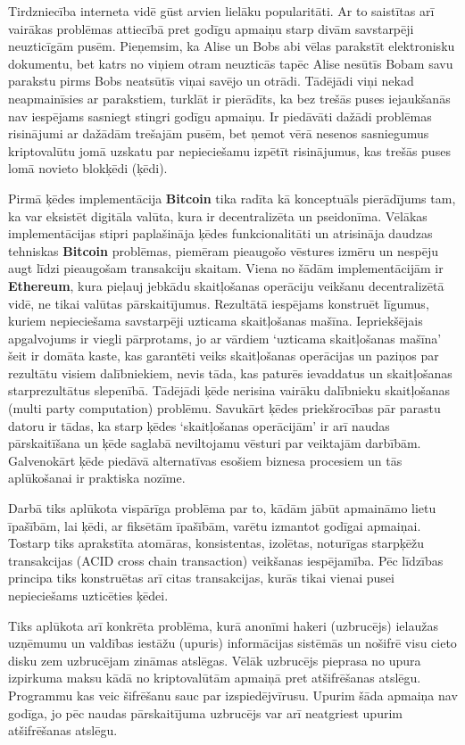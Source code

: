 Tirdzniecība interneta vidē gūst arvien lielāku popularitāti. 
Ar to saistītas arī vairākas problēmas attiecībā pret godīgu apmaiņu starp divām savstarpēji neuzticīgām pusēm. 
Pieņemsim, ka Alise un Bobs abi vēlas parakstīt elektronisku dokumentu, bet katrs no viņiem otram neuzticās tapēc Alise nesūtīs Bobam savu parakstu pirms Bobs neatsūtīs viņai savējo un otrādi. 
Tādējādi viņi nekad neapmainīsies ar parakstiem, turklāt ir pierādīts, ka bez trešās puses iejaukšanās nav iespējams sasniegt stingri godīgu apmaiņu.\cite{pagnia99}
Ir piedāvāti dažādi problēmas risinājumi ar dažādām trešajām pusēm, bet ņemot vērā nesenos sasniegumus kriptovalūtu jomā uzskatu par nepieciešamu izpētīt risinājumus, kas trešās puses lomā novieto blokķēdi (ķēdi). 


Pirmā ķēdes implementācija \textbf{Bitcoin} tika radīta kā konceptuāls pierādījums tam, ka var eksistēt digitāla valūta, kura ir decentralizēta un pseidonīma. 
Vēlākas implementācijas stipri paplašināja ķēdes funkcionalitāti un atrisināja daudzas tehniskas \textbf{Bitcoin} problēmas, piemēram pieaugošo vēstures izmēru un nespēju augt līdzi pieaugošam transakciju skaitam.%
Viena no šādām implementācijām ir \textbf{Ethereum}, kura pieļauj jebkādu skaitļošanas operāciju veikšanu decentralizētā vidē, ne tikai valūtas pārskaitījumus.\cite{etherum}
Rezultātā iespējams konstruēt līgumus, kuriem nepieciešama savstarpēji uzticama skaitļošanas mašīna.
Iepriekšējais apgalvojums ir viegli pārprotams, jo ar vārdiem `uzticama skaitļošanas mašīna' šeit ir domāta kaste, kas garantēti veiks skaitļošanas operācijas un paziņos par rezultātu visiem dalībniekiem, nevis tāda, kas paturēs ievaddatus un skaitļošanas starprezultātus slepenībā.
Tādējādi ķēde nerisina vairāku dalībnieku skaitļošanas (multi party computation) problēmu.
Savukārt ķēdes priekšrocības pār parastu datoru ir tādas, ka starp ķēdes `skaitļošanas operācijām' ir arī naudas pārskaitīšana un ķēde saglabā neviltojamu vēsturi par veiktajām darbībām.
Galvenokārt ķēde piedāvā alternatīvas esošiem biznesa procesiem un tās aplūkošanai ir praktiska nozīme.

Darbā tiks aplūkota vispārīga problēma par to, kādām jābūt apmaināmo lietu īpašībām, lai ķēdi, ar fiksētām īpašībām, varētu izmantot godīgai apmaiņai. Tostarp tiks aprakstīta atomāras, konsistentas, izolētas, noturīgas starpķēžu transakcijas (ACID cross chain transaction) veikšanas iespējamība.\cite{back14,nolan13} 
Pēc līdzības principa tiks konstruētas arī citas transakcijas, kurās tikai vienai pusei nepieciešams uzticēties ķēdei.

Tiks aplūkota arī konkrēta problēma, kurā anonīmi hakeri (uzbrucējs) ielaužas uzņēmumu un valdības iestāžu (upuris) informācijas sistēmās un nošifrē visu cieto disku zem uzbrucējam zināmas atslēgas. 
Vēlāk uzbrucējs pieprasa no upura izpirkuma maksu kādā no kriptovalūtām apmaiņā pret atšifrēšanas atslēgu. Programmu kas veic šifrēšanu sauc par izspiedējvīrusu.
Upurim šāda apmaiņa nav godīga, jo pēc naudas pārskaitījuma uzbrucējs var arī neatgriest upurim atšifrēšanas atslēgu. %


